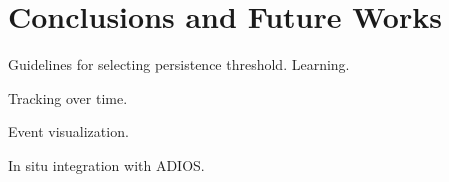 \section{Conclusions and Future Works}
\label{sec:conclusions}

Guidelines for selecting persistence threshold.  Learning.  

Tracking over time.

Event visualization.  

In situ integration with ADIOS. 



